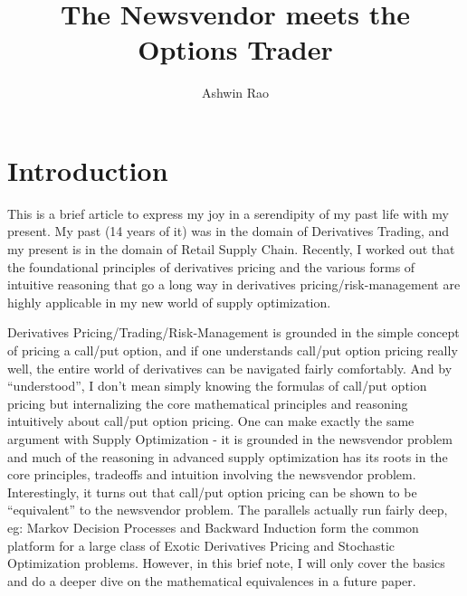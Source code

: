 \documentclass[11pt, oneside]{article}   	%
\title{The Newsvendor meets the Options Trader}
\author{Ashwin Rao}
\begin{document}
\maketitle

\section{Introduction}
This is a brief article to express my joy in a serendipity of my past life with my present. My past (14 years of it) was in the domain of Derivatives Trading,
and my present is in the domain of Retail Supply Chain. Recently, I worked out that the foundational principles of derivatives pricing and the various forms of intuitive reasoning that go a long way in derivatives pricing/risk-management
are highly applicable in my new world of supply optimization. 

Derivatives Pricing/Trading/Risk-Management is grounded in the simple concept of pricing a call/put option, and if one understands call/put option pricing really well, the entire world of derivatives can be navigated
fairly comfortably. And by ``understood'', I don't mean simply knowing the formulas of call/put option pricing but internalizing the core mathematical principles and reasoning intuitively about call/put option pricing. One can make exactly the same argument with Supply Optimization - it is grounded in the newsvendor problem and much of the reasoning in advanced supply optimization has its roots in the core principles, tradeoffs and intuition involving the newsvendor problem. Interestingly, it turns out that call/put option pricing can be shown to be ``equivalent'' to the newsvendor problem. The parallels actually run fairly deep, eg: Markov Decision Processes and Backward Induction form the common platform for a large class of Exotic Derivatives Pricing and Stochastic Optimization problems. However, in this brief note, I will only cover the basics and do a deeper dive on the mathematical equivalences in a future paper.
\end{document}
